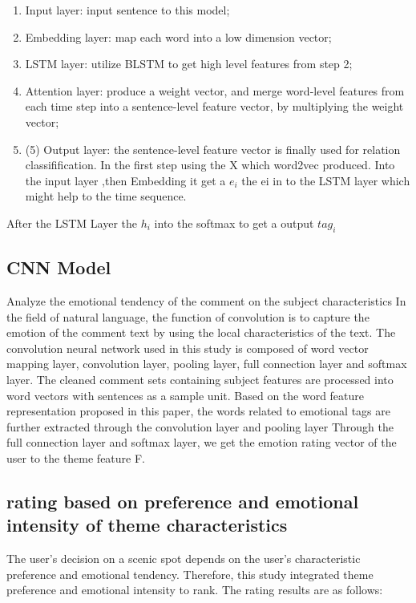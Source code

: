 \documentclass[conference]{IEEEtran}
\begin{document}
\begin{enumerate}
    \item Input layer: input sentence to this model;
    \item Embedding layer: map each word into a low dimension vector;
    \item LSTM layer: utilize BLSTM to get high level features from step 2;
    \item Attention layer: produce a weight vector, and merge word-level features from each time step into a sentence-level feature vector, by multiplying the weight vector;
    \item (5) Output layer: the sentence-level feature vector is finally used for relation classifification.
          In the first step using the X which word2vec produced. Into the input layer ,then Embedding it get a $e_i$ the ei in to the LSTM layer which might help to the time sequence.
\end{enumerate}
After the LSTM Layer the $h_i$ into the softmax to get a output $tag_i$

\subsection{CNN Model}
Analyze the emotional tendency of the comment on the subject characteristics
In the field of natural language, the function of convolution is to capture the emotion of the comment text by using the local characteristics of the text. The convolution neural network used in this study is composed of word vector mapping layer, convolution layer, pooling layer, full connection layer and softmax layer. The cleaned comment sets containing subject features are processed into word vectors with sentences as a sample unit. Based on the word feature representation proposed in this paper, the words related to emotional tags are further extracted through the convolution layer and pooling layer Through the full connection layer and softmax layer, we get the emotion rating vector of the user to the theme feature F.

\subsection{rating based on preference and emotional intensity of theme characteristics}
The user's decision on a scenic spot depends on the user's characteristic preference and emotional tendency. Therefore, this study integrated theme preference and emotional intensity to rank. The rating results are as follows:
\end{document}
